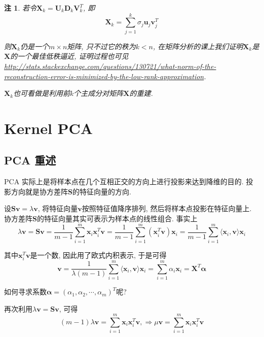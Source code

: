 \documentclass[a4paper,UTF8]{ctexart}
\theoremstyle{plain} \newtheorem{theorem}{定理}[section]
\theoremstyle{plain} \newtheorem{definition}{定义}[section]
\theoremstyle{plain} \newtheorem{lemma}{引理}[section]
\theoremstyle{plain} \newtheorem{proposition}{命题}[section]
\theoremstyle{plain} \newtheorem{example}{例}[section]
\theoremstyle{plain} \newtheorem{remark}{注}[section]
\theoremstyle{plain} \newtheorem{corollary}{推论}[section]
\begin{document}
\begin{remark}
若令$\bm{X}_k = \bm{U}_k \bm{D}_k \bm{V}_k^{T}$, 即
\begin{equation*}
\bm{X}_k = \sum_{j=1}^{k} \sigma_j \bm{u}_j \bm{v}_j^{T}
\end{equation*}

则$\bm{X}_k$仍是一个$m \times n$矩阵, 只不过它的秩为$k < n$, 在矩阵分析的课上我们证明$\bm{X}_k$是$\bm{X}$的一个最佳低秩逼近, 证明过程也可见 \url{http://stats.stackexchange.com/questions/130721/what-norm-of-the-reconstruction-error-is-minimized-by-the-low-rank-approximation}.

$\bm{X}_k$也可看做是利用前$k$个主成分对矩阵$\bm{X}$的重建.

\end{remark}


\section{Kernel PCA}
\subsection{PCA 重述}
PCA 实际上是将样本点在几个互相正交的方向上进行投影来达到降维的目的. 投影方向就是协方差阵$\bm{S}$的特征向量的方向.

设$\bm{S} \bm{v} = \lambda \bm{v}$, 将特征向量$\bm{v}$按照特征值降序排列, 然后将样本点投影在特征向量上. 协方差阵$\bm{S}$的特征向量其实可表示为样本点的线性组合. 事实上
\begin{equation*}
\lambda \bm{v} = \bm{S} \bm{v} = \frac{1}{m - 1} \sum_{i = 1}^{m} \bm{x}_i \bm{x}_{i}^{T} \bm{v} = \frac{1}{m - 1} \sum_{i = 1}^{m} (\bm{x}_{i}^{T} \bm{v}) \bm{x}_i = \frac{1}{m - 1} \sum_{i = 1}^{m} \langle \bm{x}_i, \bm{v} \rangle \bm{x}_i
\end{equation*}

其中$\bm{x}_{i}^{T} \bm{v}$是一个数, 因此用了欧式内积表示, 于是可得
\begin{equation*}
\bm{v} = \frac{1}{\lambda (m - 1)} \sum_{i = 1}^{m} \langle \bm{x}_i, \bm{v} \rangle \bm{x}_i = \sum_{i = 1}^{m} \alpha_i \bm{x}_i = \bm{X}^{T} \bm{\alpha}
\end{equation*}

如何寻求系数$\bm{\alpha} = (\alpha_1, \alpha_2, \cdots, \alpha_m)^{T}$呢?

再次利用$\lambda \bm{v} = \bm{S} \bm{v}$, 可得
\begin{equation*}
(m - 1) \lambda \bm{v} = \sum_{i = 1}^{m} \bm{x}_i \bm{x}_{i}^{T} \bm{v},  \Rightarrow \mu \bm{v} = \sum_{i = 1}^{m} \bm{x}_i \bm{x}_{i}^{T} \bm{v}
\end{equation*}
\end{document}
